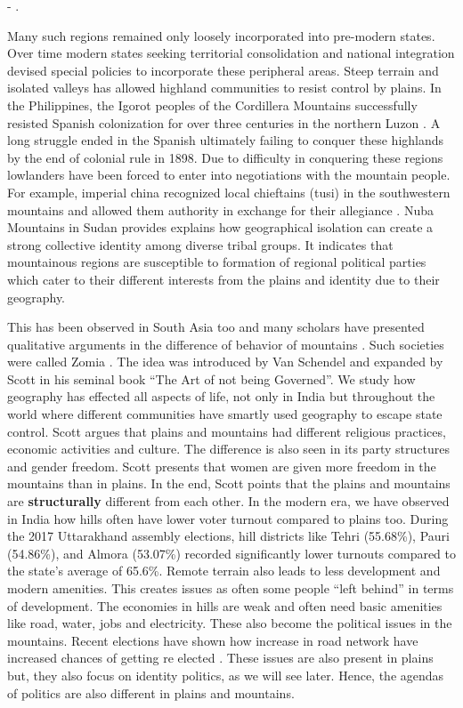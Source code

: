 \hspace*{\fill} - \cite{Hammes2017}. 



Many such regions remained only loosely incorporated into pre-modern states. Over time modern states seeking territorial consolidation and national integration devised special policies to incorporate these peripheral areas. Steep terrain and isolated valleys has allowed highland communities to  resist control by plains. In the Philippines, the Igorot peoples of the Cordillera Mountains successfully resisted Spanish colonization for over three centuries in the northern Luzon \citep{scott1970igorot}. A long struggle ended in the Spanish ultimately failing to conquer these highlands by the end of colonial rule in 1898. Due to difficulty in conquering these regions lowlanders have been forced to enter into negotiations with the mountain people. For example, imperial china  recognized local chieftains (tusi) in the southwestern mountains and allowed them authority in exchange for their allegiance \citep{took2005native}. Nuba Mountains in Sudan provides explains how geographical isolation can create a strong collective identity among diverse tribal groups. It indicates that mountainous regions are susceptible to formation of regional political parties which cater to their different interests from the plains and identity due to their geography.

This has been observed in South Asia too and many scholars have presented qualitative arguments in the difference of behavior of mountains \citep{ali2019delusional,murton2013himalayan,alam2008becoming,hussain2015remoteness}. Such societies were called Zomia \citep{van2005geographies}. The idea was introduced by Van Schendel and expanded by Scott in his seminal book ``The Art of not being Governed''. We study how geography has effected all aspects of life, not only in India but throughout the world where different communities have smartly used geography to escape state control. Scott argues that plains and mountains had different religious practices, economic activities and culture. The difference is also seen in its party structures and gender freedom. Scott presents that women are given more freedom in the mountains than in plains. In the end, Scott points that the plains and mountains are \textbf{structurally} different from each other.  In the modern era, we have observed in India how hills often have lower voter turnout compared to plains too. During the 2017 Uttarakhand assembly elections, hill districts like Tehri (55.68\%), Pauri (54.86\%), and Almora (53.07\%) recorded significantly lower turnouts compared to the state's average of 65.6\%. Remote terrain also leads to less development and modern amenities. This creates issues as often some people ``left behind'' in terms of development. The economies in hills are weak and often need basic amenities like road, water, jobs and electricity. These also become the political issues in the mountains. Recent elections have shown how increase in road network have increased chances of getting re elected \citep{basistha2024elections}. These issues are also present in plains but, they also focus on identity politics, as we will see later. Hence, the agendas of politics are also different in plains and mountains.

